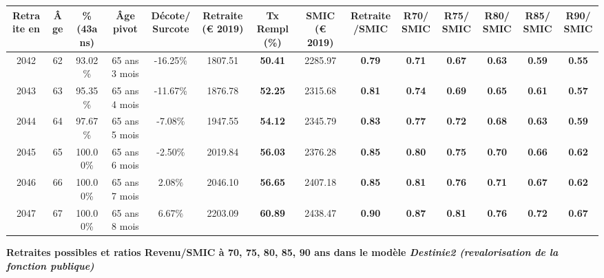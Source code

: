 \begin{adjustbox}{max width=\textwidth} 
\begin{tabular}[htb]{|c|c||c|c|c||c|c||c|c||c|c|c|c|c|} 
\hline 
 Retraite en &  Âge &  \%(43ans) &  Âge pivot &  Décote/Surcote &  Retraite (\euro{} 2019) &  Tx Rempl(\%) &  SMIC (\euro{} 2019) &  Retraite/SMIC &  R70/SMIC &  R75/SMIC &  R80/SMIC &  R85/SMIC &  R90/SMIC \\ 
\hline \hline 
 2042 &  62 &  93.02\% &  65 ans 3 mois &  -16.25\% &  1807.51 &  {\bf 50.41} &  2285.97 &  {\bf {\color{red} 0.79}} &  {\bf {\color{red} 0.71}} &  {\bf {\color{red} 0.67}} &  {\bf {\color{red} 0.63}} &  {\bf {\color{red} 0.59}} &  {\bf {\color{red} 0.55}} \\ 
\hline 
 2043 &  63 &  95.35\% &  65 ans 4 mois &  -11.67\% &  1876.78 &  {\bf 52.25} &  2315.68 &  {\bf {\color{red} 0.81}} &  {\bf {\color{red} 0.74}} &  {\bf {\color{red} 0.69}} &  {\bf {\color{red} 0.65}} &  {\bf {\color{red} 0.61}} &  {\bf {\color{red} 0.57}} \\ 
\hline 
 2044 &  64 &  97.67\% &  65 ans 5 mois &  -7.08\% &  1947.55 &  {\bf 54.12} &  2345.79 &  {\bf {\color{red} 0.83}} &  {\bf {\color{red} 0.77}} &  {\bf {\color{red} 0.72}} &  {\bf {\color{red} 0.68}} &  {\bf {\color{red} 0.63}} &  {\bf {\color{red} 0.59}} \\ 
\hline 
 2045 &  65 &  100.00\% &  65 ans 6 mois &  -2.50\% &  2019.84 &  {\bf 56.03} &  2376.28 &  {\bf {\color{red} 0.85}} &  {\bf {\color{red} 0.80}} &  {\bf {\color{red} 0.75}} &  {\bf {\color{red} 0.70}} &  {\bf {\color{red} 0.66}} &  {\bf {\color{red} 0.62}} \\ 
\hline 
 2046 &  66 &  100.00\% &  65 ans 7 mois &  2.08\% &  2046.10 &  {\bf 56.65} &  2407.18 &  {\bf {\color{red} 0.85}} &  {\bf {\color{red} 0.81}} &  {\bf {\color{red} 0.76}} &  {\bf {\color{red} 0.71}} &  {\bf {\color{red} 0.67}} &  {\bf {\color{red} 0.62}} \\ 
\hline 
 2047 &  67 &  100.00\% &  65 ans 8 mois &  6.67\% &  2203.09 &  {\bf 60.89} &  2438.47 &  {\bf {\color{red} 0.90}} &  {\bf {\color{red} 0.87}} &  {\bf {\color{red} 0.81}} &  {\bf {\color{red} 0.76}} &  {\bf {\color{red} 0.72}} &  {\bf {\color{red} 0.67}} \\ 
\hline 
\hline 
\end{tabular} 
\end{adjustbox} 
 
 \vspace{0.1cm} 
{\bf \noindent Retraites possibles et ratios Revenu/SMIC à 70, 75, 80, 85, 90 ans dans le modèle \emph{Destinie2 (revalorisation de la fonction publique)}}  
 
